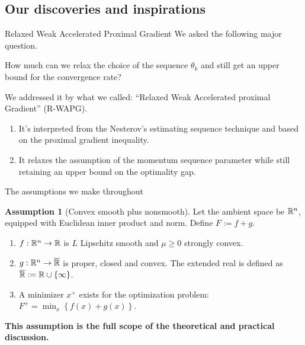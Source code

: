 \documentclass[11pt]{beamer}
\theoremstyle{definition}
\newtheorem{assumption}{Assumption}[section]
\begin{document}
    \subsection{Our discoveries and inspirations}
        \begin{frame}{Relaxed Weak Accelerated Proximal Gradient}
            We asked the following major question.  
            \begin{tcolorbox}
                How much can we relax the choice of the sequence $\theta_k$ and still get an upper bound for the convergence rate? 
            \end{tcolorbox}
            We addressed it by what we called: ``Relaxed Weak Accelerated proximal Gradient'' (R-WAPG). 
            \begin{enumerate}
                \item It's interpreted from the Nesterov's estimating sequence technique and based on the proximal gradient inequality. 
                \item It relaxes the assumption of the momentum sequence parameter while still retaining an upper bound on the optimality gap. 
            \end{enumerate}
        \end{frame}
        \begin{frame}{The assumptions we make throughout}
            \begin{assumption}[Convex smooth plus nonsmooth]
                Let the ambient space be $\mathbb R^n$, equipped with Euclidean inner product and norm. 
                Define $F := f + g$.
                \begin{enumerate}
                    \item $f: \mathbb R^n \rightarrow \mathbb R$ is $L$ Lipschitz smooth and $\mu \ge 0$ strongly convex.
                    \item $g: \mathbb R^n \rightarrow \overline {\mathbb R}$ is proper, closed and convex. The extended real is defined as $\overline {\mathbb R} := \mathbb R \cup \{\infty\}$.
                    \item A minimizer $x^+$ exists for the optimization problem: $F^+ = \min_x \left\lbrace f(x) + g(x)\right\rbrace$.
                \end{enumerate}
            \end{assumption}
            \textbf{This assumption is the full scope of the theoretical and practical discussion.}
        \end{frame}
\end{document}
